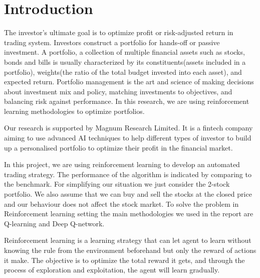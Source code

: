 \chapter{Introduction}\label{Ch:Introduction}

The investor’s ultimate goal is to optimize profit or risk-adjusted return in trading system. Investors construct a portfolio for hands-off or passive investment. A portfolio, a collection of multiple financial assets such as stocks, bonds and bills is usually characterized by its constituents(assets included in a portfolio), weights(the ratio of the total budget invested into each asset), and expected return. Portfolio management is the art and science of making decisions about investment mix and policy, matching investments to objectives, and balancing risk against performance. In this research, we are using reinforcement learning methodologies to optimize portfolios. 

Our research is supported by Magnum Research Limited. It is a fintech company aiming to use advanced AI techniques to help different types of investor to build up a personalised portfolio to optimize their profit in the financial market.

In this project, we are using reinforcement learning to develop an automated trading strategy. The performance of the algorithm is indicated by comparing to the benchmark. For simplifying our situation we just consider the 2-stock portfolio. We also assume that we can buy and sell the stocks at the closed price and our behaviour does not affect the stock market. To solve the problem in Reinforcement learning setting the main methodologies we used in the report are Q-learning and Deep Q-network. 

Reinforcement learning is a learning strategy that can let agent to learn without knowing the rule from the environment beforehand but only the reward of actions it make. The objective is to optimize the total reward it gets, and through the process of exploration and exploitation, the agent will learn gradually.

